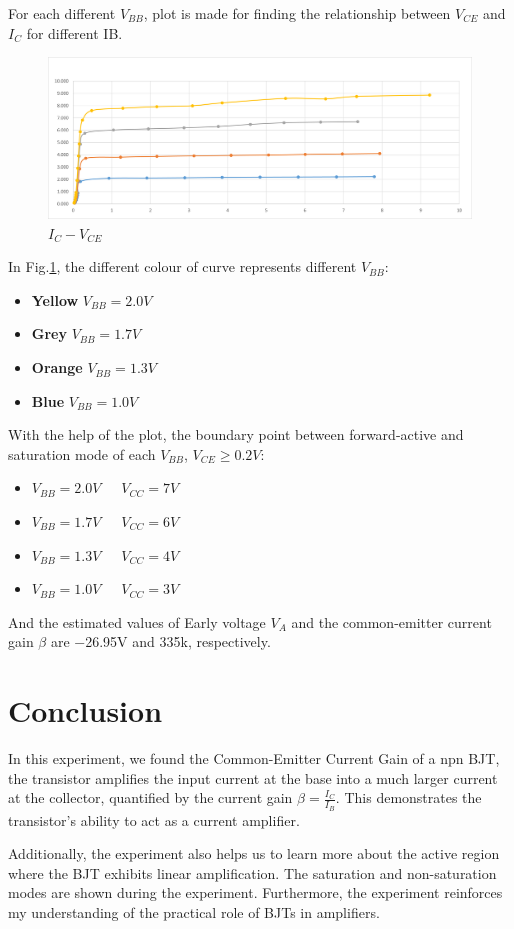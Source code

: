 \FloatBarrier
 For each different $V_{BB}$, plot is made for finding the relationship between $V_{CE}$ and $I_C$ for different IB.\par
\begin{figure}[h]
    \centering
    \includegraphics[width=0.9\linewidth]{Lab04/DataPlots.png}
    \caption{$I_C - V_{CE}$}
    \label{L4Plots}
\end{figure}
In Fig.\ref{L4Plots}, the different colour of curve represents different $V_{BB}$:
\begin{itemize}
    \item \textbf{Yellow} $V_{BB} = 2.0V$
    \item \textbf{Grey} $V_{BB} = 1.7V$
    \item \textbf{Orange} $V_{BB} = 1.3V$
    \item \textbf{Blue} $V_{BB} = 1.0V$
\end{itemize}
With the help of the plot, the boundary point between forward-active and saturation mode of each $V_{BB}$, $V_{CE} \ge 0.2V$:\par
\begin{itemize}
    \item $V_{BB} = 2.0V$~~~$V_{CC} = 7V$
    \item $V_{BB} = 1.7V$~~~$V_{CC} = 6V$
    \item $V_{BB} = 1.3V$~~~$V_{CC} = 4V$
    \item $V_{BB} = 1.0V$~~~$V_{CC} = 3V$
\end{itemize}
And the estimated values of Early voltage $V_A$ and the common-emitter current gain $\beta$ are −26.95V and 335k, respectively.


\section{Conclusion}
In this experiment, we found the Common-Emitter Current Gain of a npn BJT, the transistor amplifies the input current at the base into a much larger current at the collector, quantified by the current gain $\beta = \frac{I_C}{I_B}$. This demonstrates the transistor's ability to act as a current amplifier.\par
Additionally, the experiment also helps us to learn more about the active region where the BJT exhibits linear amplification. The saturation and non-saturation modes are shown during the experiment.
Furthermore, the experiment reinforces my understanding of the practical role of BJTs in amplifiers.